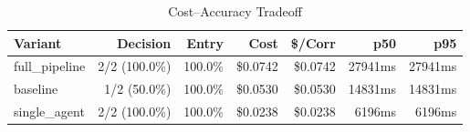 \begin{table}[htbp]
\centering
\caption{Cost--Accuracy Tradeoff}
\label{tab:cost-accuracy}
\begin{tabular}{l r r rr rr}
\toprule
Variant & Decision & Entry & Cost & \$/Corr & p50 & p95 \\
\midrule
  full\_pipeline & 2/2 (100.0\%) & 100.0\% & \$0.0742 & \$0.0742 & 27941ms & 27941ms \\
  baseline & 1/2 (50.0\%) & 100.0\% & \$0.0530 & \$0.0530 & 14831ms & 14831ms \\
  single\_agent & 2/2 (100.0\%) & 100.0\% & \$0.0238 & \$0.0238 & 6196ms & 6196ms \\
\bottomrule
\end{tabular}
\end{table}
